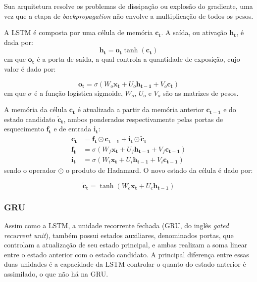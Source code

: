 Sua arquitetura resolve os problemas de dissipação ou explosão do
gradiente, uma vez que a etapa de \textit{backpropagation} não envolve a
multiplicação de todos os pesos.

A LSTM é composta por uma célula de memória $\mathbf{c_t}$. A saída, ou ativação
$\mathbf{h_t}$, é dada por:
\begin{equation}
    \mathbf{h_t} = \mathbf{o_t}\tanh(\mathbf{c_t})
\end{equation}
em que $\mathbf{o_t}$ é a porta de saída, a qual controla a quantidade de
exposição, cujo valor é dado por:

\begin{equation}
    \mathbf{o_t} = \sigma(W_o\mathbf{x_t} + U_o\mathbf{h_{t-1}} + V_o\mathbf{c_t})
\end{equation}
em que $\sigma$ é a função logística sigmoide, $W_o$, $U_o$ e $V_o$ são as
matrizes de pesos.

A memória da célula $\mathbf{c_t}$ é atualizada a partir da memória anterior
$\mathbf{c_{t-1}}$ e do estado candidato $\mathbf{\tilde{c}_t}$, ambos ponderados
respectivamente pelas portas de esquecimento $\mathbf{f_t}$ e de entrada $\mathbf{i_t}$:
\begin{align}
    \mathbf{c_t} &= \mathbf{f_t} \odot \mathbf{c_{t-1}} + \mathbf{i_t} \odot \mathbf{\tilde{c}_t} \\
    \mathbf{f_t} &= \sigma(W_f\mathbf{x_t} + U_f\mathbf{h_{t-1}} + V_f\mathbf{c_{t-1}}) \\
    \mathbf{i_t} &= \sigma(W_i\mathbf{x_t} + U_i\mathbf{h_{t-1}} + V_i\mathbf{c_{t-1}})
\end{align}
sendo o operador $\odot$ o produto
de Hadamard. O novo estado da célula é dado por:

\begin{equation}
    \mathbf{\tilde{c}_t} = \tanh(W_c\mathbf{x_t} + U_c\mathbf{h_{t-1}})
\end{equation}


\subsubsection{GRU}
Assim como a LSTM, a unidade recorrente fechada (GRU, do inglês \textit{gated
recurrent unit}), também possui estados auxiliares, denominados portas, que
controlam a atualização de seu estado principal, e ambas realizam a soma linear
entre o estado anterior com o estado candidato. A principal diferença entre
essas duas unidades é a capacidade da LSTM controlar o quanto do estado anterior
é assimilado, o que não há na GRU.

